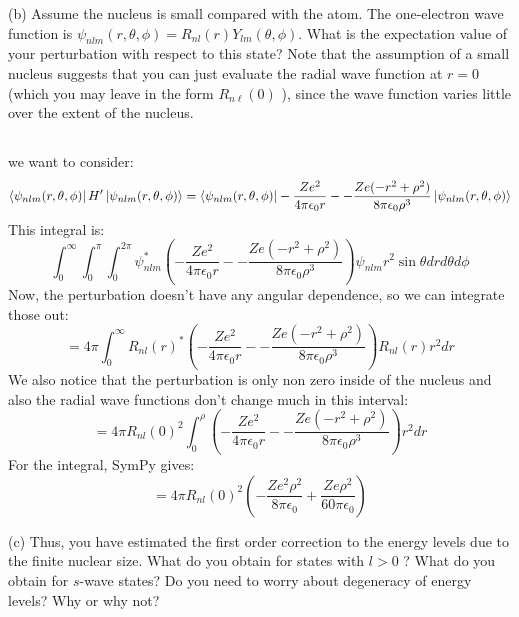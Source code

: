 \documentclass[12pt]{article}
\begin{document}
(b) Assume the nucleus is small compared with the atom. The one-electron wave function is $\psi_{n l m}(r, \theta, \phi)=R_{n l}(r) Y_{l m}(\theta, \phi)$. What is the expectation value of your perturbation with respect to this state? Note that the assumption of a small nucleus suggests that you can just evaluate the radial wave function at $r=0$ (which you may leave in the form $R_{n \ell}(0)$ ), since the wave function varies little over the extent of the nucleus.
\subsection{}
we want to consider:
\begin{equation}
  \bra{\psi_{n l m}(r, \theta, \phi)}H'\ket{\psi_{n l m}(r, \theta, \phi)} = \bra{\psi_{n l m}(r, \theta, \phi)}-\frac{Ze^2}{4\pi\epsilon_0 r} - -\frac{Ze(-r^2 + \rho^2)}{8\pi\epsilon_0\rho^3}\ket{\psi_{n l m}(r, \theta, \phi)}
\end{equation}
This integral is:
\begin{equation}
  \int_{0}^{\infty} \int_{0}^{\pi} \int_{0}^{2 \pi} \psi_{n l m}^{*}(-\frac{Ze^2}{4\pi\epsilon_0 r} - -\frac{Ze(-r^2 + \rho^2)}{8\pi\epsilon_0\rho^3}) \psi_{n l m} r^{2} \sin \theta d r d \theta d \phi
\end{equation}
Now, the perturbation doesn't have any angular dependence, so we can integrate those out:
\begin{equation}
  = 4 \pi \int_{0}^{\infty} R_{nl}(r)^{*}(-\frac{Ze^2}{4\pi\epsilon_0 r} - -\frac{Ze(-r^2 + \rho^2)}{8\pi\epsilon_0\rho^3}) R_{nl}(r) r^{2} d r
\end{equation}
We also notice that the perturbation is only non zero inside of the nucleus and also the radial wave functions don't change much in this interval:
\begin{equation}
  = 4 \pi R_{nl}(0)^2 \int_{0}^{\rho}(-\frac{Ze^2}{4\pi\epsilon_0 r} - -\frac{Ze(-r^2 + \rho^2)}{8\pi\epsilon_0\rho^3}) r^{2} d r
\end{equation}
For the integral, SymPy gives:
\begin{equation}
  = 4 \pi R_{nl}(0)^2 \left(-\frac{Ze^2\rho^2}{8\pi\epsilon_0} + \frac{Ze\rho^2}{60\pi\epsilon_0} \right)
\end{equation}

(c) Thus, you have estimated the first order correction to the energy levels due to the finite nuclear size. What do you obtain for states with $l>0$ ? What do you obtain for $s$-wave states? Do you need to worry about degeneracy of energy levels? Why or why not?
\end{document}
